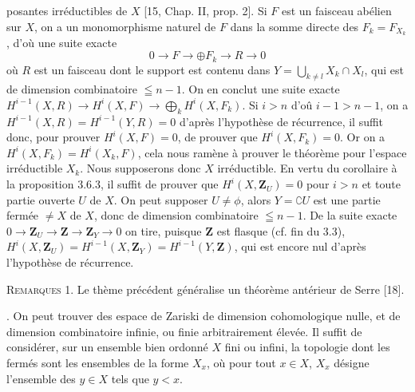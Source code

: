 
\noindent posantes irréductibles de $X$ [15, Chap. II, prop. 2]. Si $F$ est un
faisceau abélien sur $X$, on a un monomorphisme naturel de $F$ dans la somme
directe des $F_k=F_{X_k}$, d'où une suite exacte
\[
0\to F\to\oplus F_k\to R
\to0
\]
où $R$ est un faisceau dont le support est contenu dans
$Y=\displaystyle\bigcup\limits_{k\ne l}X_k\cap X_l$,
qui est de dimension combinatoire $\leqq n-1$. On en conclut une suite exacte
$H^{i-1}(X,R)\to H^i(X,F)\to\displaystyle\bigoplus\limits_k H^i(X,F_k)$.
Si $i>n$ d'oû $i-1>n-1$, on a
$H^{i-1}(X,R)=H^{i-1}(Y,R)=0$ d'après l'hypothèse de récurrence, il suffit
donc, pour prouver $H^i(X,F)=0$, de prouver que $H^i(X,F_k)=0$. Or on a
$H^i(X,F_k)=H^i(X_k,F)$,
cela nous ramène à prouver le théorème pour l'espace irréductible $X_k$. Nous
supposerons donc $X$ irréductible. En vertu du corollaire à la proposition
3.6.3, il suffit de prouver que $H^i(X,\mathbf Z_U)=0$ pour $i>n$ et toute partie
ouverte $U$ de $X$. On peut supposer $U\ne\phi$, alors $Y=\complement U$ est
une partie fermée $\ne X$ de $X$, donc de dimension combinatoire
$\leqq n-1$. De la suite exacte
$0\to \mathbf Z_U\to \mathbf Z\to \mathbf Z_Y\to0$
on tire, puisque $\mathbf Z$ est flasque (cf. fin du 3.3),
$H^i(X,\mathbf Z_U)=H^{i-1}(X,\mathbf Z_Y)=H^{i-1}(Y,\mathbf Z)$,
qui est encore nul d'après l'hypothèse de récurrence.

\indent\textsc{Remarques} 1. Le thème précédent généralise un théorème
antérieur de Serre [18].

. On peut trouver des espace de Zariski de dimension cohomologique
nulle, et de dimension combinatoire infinie, ou finie arbitrairement élevée.
Il suffit de considérer, sur un ensemble bien ordonné $X$ fini ou infini, la
topologie dont les fermés sont les ensembles de la forme $X_x$, où pour tout
$x\in X$, $X_x$ désigne l'ensemble des $y\in X$ tels que $y<x$.


